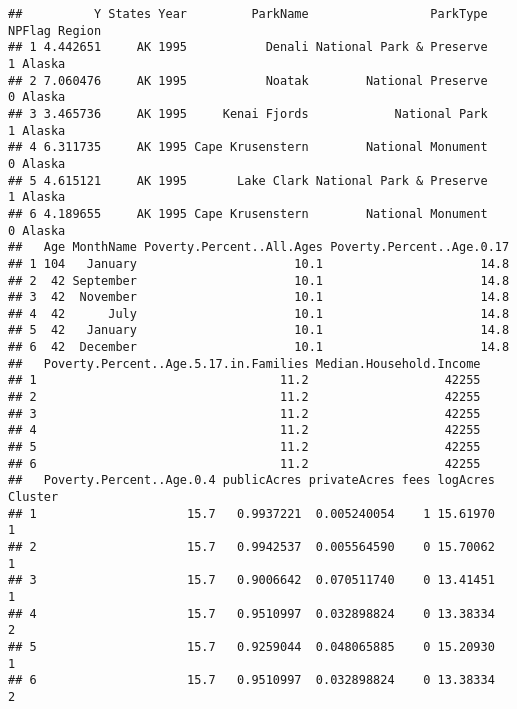 \documentclass[
]{article}
\newenvironment{Shaded}{\begin{snugshade}}{\end{snugshade}}
\newcommand{\DecValTok}[1]{\textcolor[rgb]{0.00,0.00,0.81}{#1}}
\newcommand{\NormalTok}[1]{#1}
\newcommand{\OperatorTok}[1]{\textcolor[rgb]{0.81,0.36,0.00}{\textbf{#1}}}
\newcommand{\StringTok}[1]{\textcolor[rgb]{0.31,0.60,0.02}{#1}}
\begin{document}
\begin{verbatim}
##          Y States Year         ParkName                 ParkType NPFlag Region
## 1 4.442651     AK 1995           Denali National Park & Preserve      1 Alaska
## 2 7.060476     AK 1995           Noatak        National Preserve      0 Alaska
## 3 3.465736     AK 1995     Kenai Fjords            National Park      1 Alaska
## 4 6.311735     AK 1995 Cape Krusenstern        National Monument      0 Alaska
## 5 4.615121     AK 1995       Lake Clark National Park & Preserve      1 Alaska
## 6 4.189655     AK 1995 Cape Krusenstern        National Monument      0 Alaska
##   Age MonthName Poverty.Percent..All.Ages Poverty.Percent..Age.0.17
## 1 104   January                      10.1                      14.8
## 2  42 September                      10.1                      14.8
## 3  42  November                      10.1                      14.8
## 4  42      July                      10.1                      14.8
## 5  42   January                      10.1                      14.8
## 6  42  December                      10.1                      14.8
##   Poverty.Percent..Age.5.17.in.Families Median.Household.Income
## 1                                  11.2                   42255
## 2                                  11.2                   42255
## 3                                  11.2                   42255
## 4                                  11.2                   42255
## 5                                  11.2                   42255
## 6                                  11.2                   42255
##   Poverty.Percent..Age.0.4 publicAcres privateAcres fees logAcres Cluster
## 1                     15.7   0.9937221  0.005240054    1 15.61970       1
## 2                     15.7   0.9942537  0.005564590    0 15.70062       1
## 3                     15.7   0.9006642  0.070511740    0 13.41451       1
## 4                     15.7   0.9510997  0.032898824    0 13.38334       2
## 5                     15.7   0.9259044  0.048065885    0 15.20930       1
## 6                     15.7   0.9510997  0.032898824    0 13.38334       2
\end{verbatim}

\begin{Shaded}
\end{Shaded}
\end{document}
